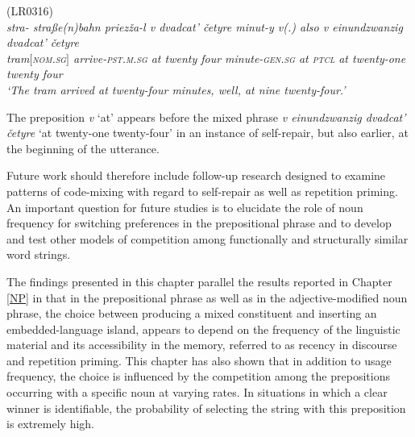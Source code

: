 \ea
\label{ex:5:17}
(LR0316)\\
\gll \itshape{stra-} \itshape{stra{ß}e(n)bahn} {priezža-l} {v} {dvadcat'} {četyre} {minut-y} {v(.)} \textit{also} {v} \textit{einundzwanzig} {dvadcat'} {četyre}\\
	{} {tram$[$\textsc{nom.sg}$]$} arrive-\textsc{pst.m.sg} at twenty four minute-\textsc{gen.sg} at \textsc{ptcl} at twenty-one twenty four\\
\glt `The tram arrived at twenty-four minutes, well, at nine twenty-four.'
\z

\noindent The preposition \textit{v} `at' appears before the mixed phrase \textit{v einundzwanzig dvadcat' četyre} `at twenty-one twenty-four' in an instance of self-repair, but also earlier, at the beginning of the utterance. 

Future work should therefore include follow-up research designed to examine patterns of code-mixing with regard to self-repair as well as repetition priming. An important question for future studies is to elucidate the role of noun frequency for switching preferences in the prepositional phrase and to develop and test other models of competition among functionally and structurally similar word strings. 

The findings presented in this chapter parallel the results reported in Chapter \ref{NP} in that in the prepositional phrase as well as in the adjective-modified noun phrase, the choice between producing a mixed constituent and inserting an embedded-language island, appears to depend on the frequency of the linguistic material and its accessibility in the memory, referred to as recency in discourse and repetition priming. This chapter has also shown that in addition to usage frequency, the choice is influenced by the competition among the prepositions occurring with a specific noun at varying rates. In situations in which a clear winner is identifiable, the probability of selecting the string with this preposition is extremely high. 

